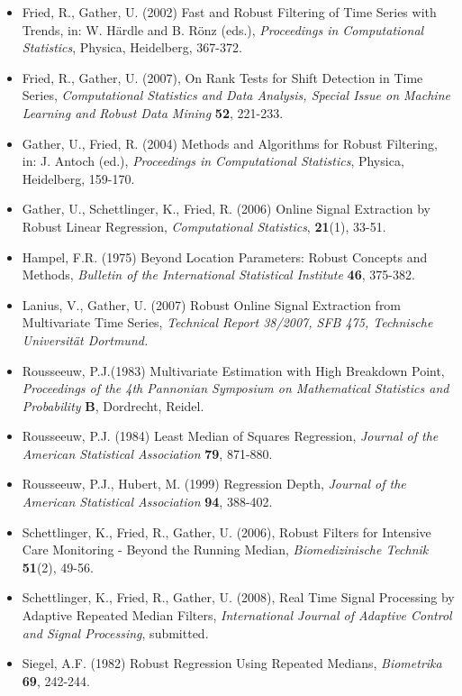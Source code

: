 \documentclass[a4paper]{scrartcl}
\begin{document}
\begin{itemize}
\item
Fried, R., Gather, U. (2002) Fast and Robust Filtering of Time Series
with Trends, in: W. H\"{a}rdle and B. R\"{o}nz (eds.),
\emph{Proceedings in Computational Statistics}, Physica, Heidelberg, 367-372.

\item
Fried, R., Gather, U. (2007), On Rank Tests for Shift
Detection in Time Series, \emph{Computational Statistics and Data
Analysis, Special Issue on Machine Learning and Robust Data
Mining} \textbf{52}, 221-233.

\item Gather, U., Fried, R. (2004) Methods and Algorithms for Robust
Filtering, in: J. Antoch (ed.), \emph{Proceedings in Computational
Statistics}, Physica, Heidelberg,  159-170.

\item Gather, U., Schettlinger, K., Fried, R. (2006) Online Signal
Extraction by Robust Linear Regression, \emph{Computational
Statistics}, \textbf{21}(1), 33-51.

\item
Hampel, F.R. (1975) Beyond Location Parameters: Robust Concepts
and Methods, \emph{Bulletin of the International Statistical
Institute} \textbf{46}, 375-382.

\item
Lanius, V., Gather, U. (2007) Robust Online Signal Extraction from
Multivariate Time Series, \emph{Technical Report 38/2007, SFB 475,
Technische Universit\"{a}t Dortmund.}

\item
Rousseeuw, P.J.(1983) Multivariate Estimation with High Breakdown
Point, \emph{Proceedings of the 4th Pannonian Symposium on Mathematical
Statistics and Probability} \textbf{B}, Dordrecht, Reidel.

\item Rousseeuw, P.J. (1984) Least Median of Squares Regression,
\emph{Journal of the American Statistical Association} \textbf{79}, 871-880.

\item
Rousseeuw, P.J., Hubert, M. (1999) Regression Depth, \emph{Journal of the
American Statistical Association} \textbf{94}, 388-402.

\item
Schettlinger, K., Fried, R., Gather, U. (2006), Robust Filters
for Intensive Care Monitoring - Beyond the Running Median,
\emph{Biomedizinische Technik} \textbf{51}(2), 49-56.

\item
Schettlinger, K., Fried, R., Gather, U. (2008),
Real Time Signal Processing by Adaptive Repeated Median Filters,
\emph{International Journal of Adaptive Control and Signal Processing}, submitted.

\item
Siegel, A.F. (1982) Robust Regression Using Repeated
Medians, \emph{Biometrika} \textbf{69}, 242-244.
\end{itemize}
\end{document}

